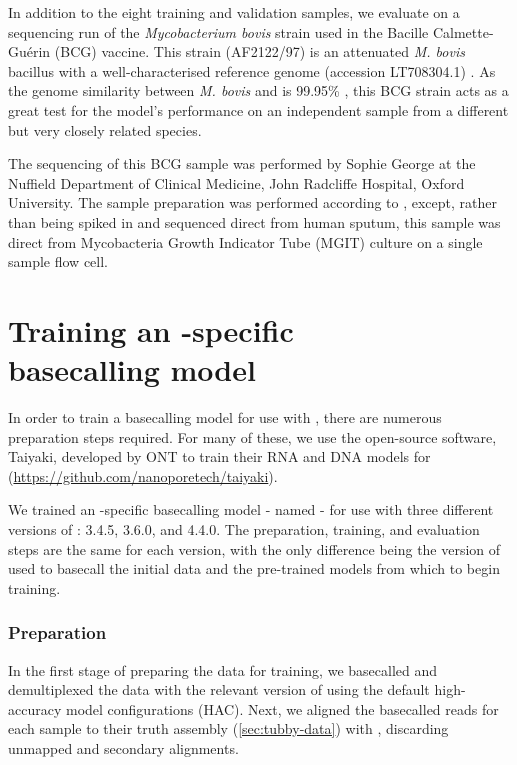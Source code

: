 In addition to the eight training and validation samples, we evaluate on a \ont{} sequencing run of the \textit{Mycobacterium bovis} strain used in the Bacille Calmette-Guérin (BCG) vaccine. This strain (AF2122/97) is an attenuated \textit{M. bovis} bacillus \cite{luca2013} with a well-characterised reference genome (accession LT708304.1) \cite{Malone2017}. As the genome similarity between \textit{M. bovis} and \mtb{} is 99.95\% \cite{Kanipe2020}, this BCG strain acts as a great test for the model's performance on an independent sample from a different but very closely related species.

The \ont{} sequencing of this BCG sample was performed by Sophie George at the Nuffield Department of Clinical Medicine, John Radcliffe Hospital, Oxford University. The sample preparation was performed according to \cite{George2020}, except, rather than being spiked in and sequenced direct from human sputum, this sample was direct from Mycobacteria Growth Indicator Tube (MGIT) culture on a single sample flow cell.

\section[Training an \mtb{}-specific \ont{} basecalling model]{Training an \mtb{}-specific \ont{}\\ basecalling model}

In order to train a basecalling model for use with \guppy{}, there are numerous preparation steps required. For many of these, we use the open-source software, Taiyaki, developed by ONT to train their RNA and DNA models for \guppy{} (\url{https://github.com/nanoporetech/taiyaki}).

We trained an \mtb{}-specific basecalling model - named \tubby{} - for use with three different versions of \guppy{}: 3.4.5, 3.6.0, and 4.4.0. The preparation, training, and evaluation steps are the same for each version, with the only difference being the version of \guppy{} used to basecall the initial data and the pre-trained models from which to begin training.

\subsubsection{Preparation}

In the first stage of preparing the data for training, we basecalled and demultiplexed the data with the relevant version of \guppy{} using the default high-accuracy model configurations (HAC). Next, we aligned the basecalled reads for each sample to their truth assembly (\autoref{sec:tubby-data}) with  \cite{li2018}, discarding unmapped and secondary alignments.

